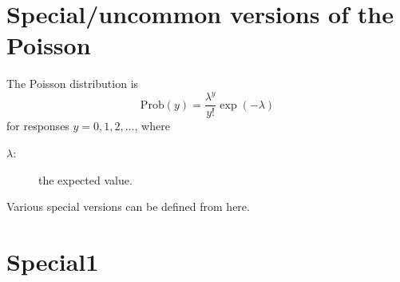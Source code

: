 \documentclass[a4paper,11pt]{article}
\begin{document}
\section*{Special/uncommon versions of the Poisson}

The Poisson distribution is
\begin{displaymath}
    \text{Prob}(y) = \frac{\lambda^{y}}{y!}\exp(-\lambda)
\end{displaymath}
for responses $y=0, 1, 2, \ldots$, where
\begin{description}
\item[$\lambda$:] the expected value.
\end{description}
Various special versions can be defined from here.

\section*{Special1}
\end{document}
